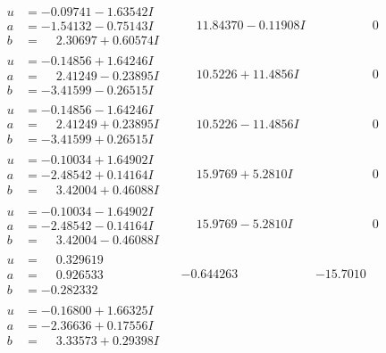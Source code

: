 \documentclass[1p]{elsarticle_modified}
\theoremstyle{definition}
\begin{document}
$$\begin{array}{c|c|c}
\begin{aligned}
u &= -0.09741 - 1.63542 I \\
a &= -1.54132 - 0.75143 I \\
b &= \phantom{-}2.30697 + 0.60574 I\end{aligned}
 & \phantom{-}11.84370 - 0.11908 I & \phantom{-0.000000 } 0 \\ \hline\begin{aligned}
u &= -0.14856 + 1.64246 I \\
a &= \phantom{-}2.41249 - 0.23895 I \\
b &= -3.41599 - 0.26515 I\end{aligned}
 & \phantom{-}10.5226 + 11.4856 I & \phantom{-0.000000 } 0 \\ \hline\begin{aligned}
u &= -0.14856 - 1.64246 I \\
a &= \phantom{-}2.41249 + 0.23895 I \\
b &= -3.41599 + 0.26515 I\end{aligned}
 & \phantom{-}10.5226 - 11.4856 I & \phantom{-0.000000 } 0 \\ \hline\begin{aligned}
u &= -0.10034 + 1.64902 I \\
a &= -2.48542 + 0.14164 I \\
b &= \phantom{-}3.42004 + 0.46088 I\end{aligned}
 & \phantom{-}15.9769 + 5.2810 I & \phantom{-0.000000 } 0 \\ \hline\begin{aligned}
u &= -0.10034 - 1.64902 I \\
a &= -2.48542 - 0.14164 I \\
b &= \phantom{-}3.42004 - 0.46088 I\end{aligned}
 & \phantom{-}15.9769 - 5.2810 I & \phantom{-0.000000 } 0 \\ \hline\begin{aligned}
u &= \phantom{-}0.329619\phantom{ +0.000000I} \\
a &= \phantom{-}0.926533\phantom{ +0.000000I} \\
b &= -0.282332\phantom{ +0.000000I}\end{aligned}
 & -0.644263\phantom{ +0.000000I} & -15.7010\phantom{ +0.000000I} \\ \hline\begin{aligned}
u &= -0.16800 + 1.66325 I \\
a &= -2.36636 + 0.17556 I \\
b &= \phantom{-}3.33573 + 0.29398 I\end{aligned}

\end{array}$$
\end{document}

